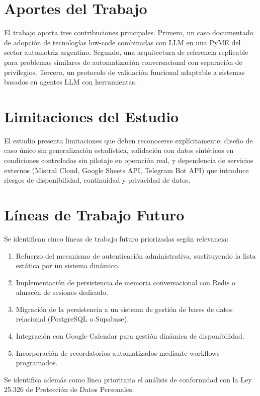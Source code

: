 \documentclass[12pt,a4paper]{report}
\begin{document}
\section{Aportes del Trabajo}

El trabajo aporta tres contribuciones principales. Primero, un caso documentado de adopción de tecnologías low-code combinadas con LLM en una PyME del sector automotriz argentino. Segundo, una arquitectura de referencia replicable para problemas similares de automatización conversacional con separación de privilegios. Tercero, un protocolo de validación funcional adaptable a sistemas basados en agentes LLM con herramientas.

\section{Limitaciones del Estudio}

El estudio presenta limitaciones que deben reconocerse explícitamente: diseño de caso único sin generalización estadística, validación con datos sintéticos en condiciones controladas sin pilotaje en operación real, y dependencia de servicios externos (Mistral Cloud, Google Sheets API, Telegram Bot API) que introduce riesgos de disponibilidad, continuidad y privacidad de datos.

\section{Líneas de Trabajo Futuro}

Se identifican cinco líneas de trabajo futuro priorizadas según relevancia:

\begin{enumerate}
  \item Refuerzo del mecanismo de autenticación administrativa, sustituyendo la lista estática por un sistema dinámico.
  \item Implementación de persistencia de memoria conversacional con Redis o almacén de sesiones dedicado.
  \item Migración de la persistencia a un sistema de gestión de bases de datos relacional (PostgreSQL o Supabase).
  \item Integración con Google Calendar para gestión dinámica de disponibilidad.
  \item Incorporación de recordatorios automatizados mediante workflows programados.
\end{enumerate}

Se identifica además como línea prioritaria el análisis de conformidad con la Ley 25.326 de Protección de Datos Personales.
\end{document}
